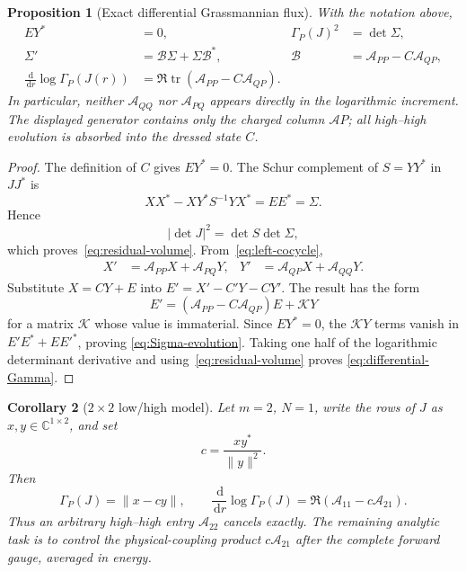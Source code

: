 \documentclass[11pt]{article}
\newcommand{\C}{\mathbb C}
\newcommand{\dd}{\,\mathrm d}
\newtheorem{proposition}{Proposition}[section]
\newtheorem{corollary}[proposition]{Corollary}
\theoremstyle{definition}
\begin{document}
\begin{proposition}[Exact differential Grassmannian flux]
\label{prop:differential-flux}
With the notation above,
\begin{align}
 EY^*&=0,
 &\Gamma_P(J)^2&=\det\Sigma,
 \label{eq:residual-volume}\\
 \Sigma'
 &=\mathcal B\Sigma+\Sigma\mathcal B^*,
 &\mathcal B&=\mathcal A_{PP}-C\mathcal A_{QP},
 \label{eq:Sigma-evolution}\\
 \frac{\dd}{\dd r}\log\Gamma_P(J(r))
 &=\Re\operatorname{tr}\!\left(
 \mathcal A_{PP}-C\mathcal A_{QP}\right).
 \label{eq:differential-Gamma}
\end{align}
In particular, neither $\mathcal A_{QQ}$ nor $\mathcal A_{PQ}$ appears
directly in the logarithmic increment.  The displayed generator contains only
the charged column $\mathcal A P$; all high--high evolution is absorbed into
the dressed state $C$.
\end{proposition}

\begin{proof}
The definition of $C$ gives $EY^*=0$.  The Schur complement of $S=YY^*$ in
$JJ^*$ is
\begin{equation}
 XX^*-XY^*S^{-1}YX^*=EE^*=\Sigma.
 \label{eq:Schur-Sigma}
\end{equation}
Hence
\begin{equation}
 |\det J|^2=\det S\det\Sigma,
 \end{equation}
which proves~\eqref{eq:residual-volume}.  From~\eqref{eq:left-cocycle},
\begin{align}
 X'&=\mathcal A_{PP}X+\mathcal A_{PQ}Y,
 &Y'&=\mathcal A_{QP}X+\mathcal A_{QQ}Y.
 \end{align}
Substitute $X=CY+E$ into $E'=X'-C'Y-CY'$.  The result has the form
\begin{equation}
 E'=(\mathcal A_{PP}-C\mathcal A_{QP})E+\mathcal K Y
 \label{eq:E-evolution}
\end{equation}
for a matrix $\mathcal K$ whose value is immaterial.  Since $EY^*=0$, the
$\mathcal K Y$ terms vanish in $E'E^*+EE'^*$, proving
\eqref{eq:Sigma-evolution}.  Taking one half of the logarithmic determinant
derivative and using~\eqref{eq:residual-volume} proves
\eqref{eq:differential-Gamma}.
\end{proof}

\begin{corollary}[$2\times2$ low/high model]
\label{cor:two-channel-flux}
Let $m=2$, $N=1$, write the rows of $J$ as $x,y\in\C^{1\times2}$, and set
\begin{equation}
 c=\frac{xy^*}{\|y\|^2}.
 \end{equation}
Then
\begin{equation}
 \Gamma_P(J)=\|x-cy\|,
 \qquad
 \frac{\dd}{\dd r}\log\Gamma_P(J)
 =\Re(\mathcal A_{11}-c\mathcal A_{21}).
 \label{eq:two-channel-flux}
\end{equation}
Thus an arbitrary high--high entry $\mathcal A_{22}$ cancels exactly.  The
remaining analytic task is to control the physical-coupling product
$c\mathcal A_{21}$ after the complete forward gauge, averaged in energy.
\end{corollary}
\end{document}

